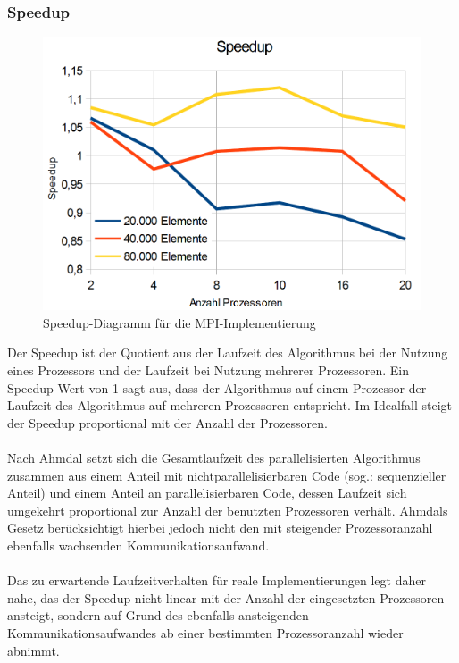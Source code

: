 \documentclass[a4paper,12pt]{scrartcl}
\begin{document}
\subsubsection{Speedup}
\begin{figure}[htb]
  \begin{center}
    \includegraphics[width=1\hsize]{../speedup.png}
  \end{center}
  \caption{\label{mpispeedup}
    Speedup-Diagramm f\"ur die MPI-Implementierung}
\end{figure}
Der Speedup ist der Quotient aus der Laufzeit des Algorithmus bei der Nutzung eines Prozessors und der Laufzeit bei Nutzung mehrerer Prozessoren.
Ein Speedup-Wert von 1 sagt aus, dass der Algorithmus auf einem Prozessor der Laufzeit des Algorithmus auf mehreren Prozessoren entspricht.
Im Idealfall steigt der Speedup proportional mit der Anzahl der Prozessoren. \\\\

Nach Ahmdal setzt sich die Gesamtlaufzeit des parallelisierten Algorithmus zusammen aus einem Anteil mit nichtparallelisierbaren Code (sog.: sequenzieller
Anteil) und einem Anteil an parallelisierbaren Code, dessen Laufzeit sich umgekehrt proportional zur Anzahl der benutzten Prozessoren verhält.
Ahmdals Gesetz berücksichtigt hierbei jedoch nicht den mit steigender Prozessoranzahl ebenfalls wachsenden Kommunikationsaufwand. \\\\

Das zu erwartende Laufzeitverhalten für reale Implementierungen legt daher nahe, das der Speedup nicht linear mit der Anzahl der eingesetzten Prozessoren
ansteigt, sondern auf Grund des ebenfalls ansteigenden Kommunikationsaufwandes ab einer bestimmten Prozessoranzahl wieder abnimmt. \\ \\
\end{document}
